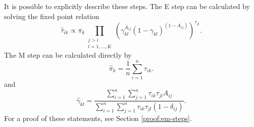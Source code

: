 \documentclass[../../main.tex]{subfiles} %
\begin{document}
It is possible to explicitly describe these steps. The E step can be calculated 
by solving the fixed point relation
\begin{equation}
	\hat \tau_{ik} \propto \pi_k \prod_{\substack{j > i \\ l = 1, \dots, K}}
	\left( \gamma_{kl}^{A_{ij}} \left( 1 - \gamma_{kl} \right)^{\left( 1 -
		A_{ij}
		\right)} \right)^{\tau_{jl}}.
	\label{eq:fixed-point-tau}
\end{equation}
The M step can be calculated directly by
\begin{equation} \label{eq:pi-hat}
	\hat \pi_k = \frac{1}{n} \sum_{i=1}^n \tau_{ik}.
\end{equation}
and
\begin{equation} \label{eq:gamma-hat}
	\hat \gamma_{kl} = \frac{\sum_{i=1}^n \sum_{j=1}^n \tau_{ik}
		\tau_{jl} A_{ij}}{\sum_{i=1}^n \sum_{j=1}^n \tau_{ik} \tau_{jl} \left(
		1 - \delta_{ij} \right)}.
\end{equation}
For a proof of these statements, see Section \ref{proof:em-steps}.
\end{document}
